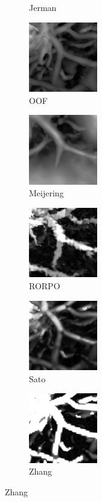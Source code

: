 \begin{figure}[!ht]
\begin{subfigure}[t]{0.30\textwidth}
        \caption{Jerman}
      \end{subfigure}
      \begin{subfigure}[t]{0.30\textwidth}
        \includegraphics[clip = true, trim  = 0 50 0 80, width=30mm]{Images/Ircad_k_OOF_GM.png}
        \caption{OOF}
      \end{subfigure}
      \begin{subfigure}[t]{0.30\textwidth}
        \includegraphics[clip = true, trim  = 0 50 0 80, width=30mm]{Images/Ircad_k_Meijering.png}
        \caption{Meijering}
      \end{subfigure}
      \begin{subfigure}[t]{0.30\textwidth}
        \includegraphics[clip = true, trim  = 0 50 0 80, width=30mm]{Images/Ircad_k_RORPO.png}
        \caption{RORPO}
      \end{subfigure}
      \begin{subfigure}[t]{0.30\textwidth}
        \includegraphics[clip = true, trim  = 0 50 0 80, width=30mm]{Images/Ircad_k_Sato.png}
        \caption{Sato}
      \end{subfigure}
      \begin{subfigure}[t]{0.30\textwidth}
        \includegraphics[clip = true, trim  = 0 50 0 80, width=30mm]{Images/Ircad_k_Zhang.png}
        \caption{Zhang}
      \end{subfigure}


\end{figure}
